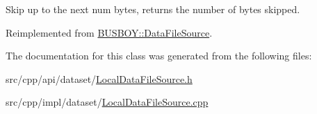 Skip up to the next num bytes, returns the number of bytes skipped. 

Reimplemented from \hyperlink{classBUSBOY_1_1DataFileSource_ab50fe5821ccaa51a26b65debe8fd1c84}{BUSBOY::DataFileSource}.

The documentation for this class was generated from the following files:\begin{DoxyCompactItemize}
\item 
src/cpp/api/dataset/\hyperlink{LocalDataFileSource_8h}{LocalDataFileSource.h}\item 
src/cpp/impl/dataset/\hyperlink{LocalDataFileSource_8cpp}{LocalDataFileSource.cpp}\end{DoxyCompactItemize}
